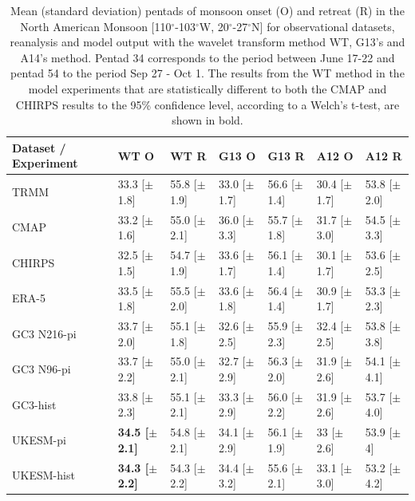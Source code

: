 \begin{table}[b!]
\caption{Mean (standard deviation) pentads of monsoon onset (O) and retreat (R) in the North American Monsoon [110$^\circ$-103$^\circ$W, 20$^\circ$-27$^\circ$N] for observational datasets, reanalysis and model output with the wavelet transform method WT, G13's and A14's method. Pentad 34 corresponds to the period between June 17-22 and pentad 54 to the period Sep 27 - Oct 1. The results from the WT method in the model experiments that are statistically different to both the CMAP and CHIRPS results to the 95\% confidence level, according to a Welch's t-test, are shown in bold. }
\label{tab:3}       %
\begin{tabular}{p{2.2cm}p{1.765cm}p{1.765cm}p{1.765cm}p{1.765cm}p{1.7655cm}p{1.7655cm}}
\hline\noalign{\smallskip} \small
Dataset / Experiment & WT O 	& WT R 	& G13 O & G13 R & A12 O & A12 R \\ \hline
TRMM & 33.3 [$\pm$1.8] & 55.8 [$\pm$1.9] & 33.0 [$\pm$1.7] & 56.6 [$\pm$1.4] & 30.4 [$\pm$1.7] & 53.8 [$\pm$2.0]  \\
CMAP & 33.2 [$\pm$1.6] & 55.0 [$\pm$2.1] & 36.0 [$\pm$3.3] & 55.7 [$\pm$1.8] & 31.7 [$\pm$3.0] & 54.5 [$\pm$3.3]   \\
CHIRPS & 32.5 [$\pm$1.5] & 54.7 [$\pm$1.9] & 33.6 [$\pm$1.7]& 56.1 [$\pm$1.4] & 30.1 [$\pm$1.7] & 53.6 [$\pm$2.5]   \\
ERA-5 & 33.5 [$\pm$1.8] & 55.5 [$\pm$2.0] & 33.6 [$\pm$1.8]& 56.4 [$\pm$1.4] & 30.9 [$\pm$1.7] & 53.3 [$\pm$2.3]   \\
GC3 N216-pi  & 33.7 [$\pm$2.0] & 55.1 [$\pm$1.8]& 32.6 [$\pm$2.5] & 55.9 [$\pm$2.3] & 32.4 [$\pm$2.5] &53.8 [$\pm$3.8]  \\
GC3 N96-pi & 33.7 [$\pm$2.2] & 55.0 [$\pm$2.1] & 32.7 [$\pm$2.9] & 56.3 [$\pm$2.0] & 31.9 [$\pm$2.6] & 54.1 [$\pm$4.1]  \\
GC3-hist & 33.8 [$\pm$2.3] & 55.1 [$\pm$2.1]& 33.3 [$\pm$2.9] & 56.0 [$\pm$2.2] & 31.9 [$\pm$2.6] & 53.7 [$\pm$4.0]  \\
UKESM-pi & \bf{34.5} [$\pm$2.1] & 54.8 [$\pm$2.1] & 34.1 [$\pm$2.9] & 56.1 [$\pm$1.9] & 33 [$\pm$2.6] & 53.9 [$\pm$4]   \\
UKESM-hist & \bf{34.3} [$\pm$2.2] & 54.3 [$\pm$2.2]& 34.4 [$\pm$3.2] & 55.6 [$\pm$2.1] & 33.1 [$\pm$3.0] & 53.2 [$\pm$4.2] \\
\end{tabular}
\end{table}



